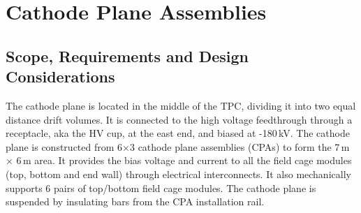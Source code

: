 


\section{Cathode Plane Assemblies}


\subsection{Scope, Requirements and Design Considerations}

The cathode plane is located in the middle of the TPC, dividing it into two equal distance drift volumes.  It is connected to the high voltage feedthrough through a receptacle, aka the HV cup, at the east end, and biased at -180\,kV.  The cathode plane is constructed from 6$\times$3 cathode plane assemblies (CPAs) to form the 7\,m $\times$ 6\,m area.  It provides the bias voltage and current to all the field cage modules (top, bottom and end wall) through electrical interconnects.  It also mechanically supports 6 pairs of top/bottom field cage modules.
The cathode plane is suspended by insulating bars from the CPA installation rail.



